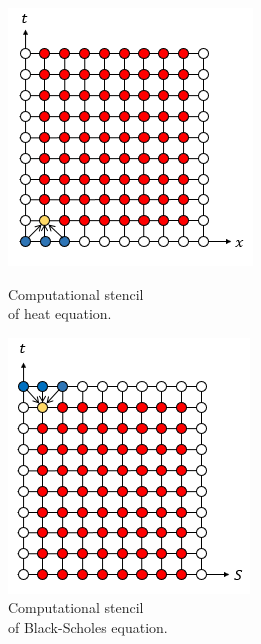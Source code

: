 \documentclass[12pt, oneside]{book}
\theoremstyle{plain}
\theoremstyle{definition}
\begin{document}
\begin{figure}[!htb]
  \begin{minipage}[b]{0.5\textwidth}
    \includegraphics[width=\textwidth]{ExplicitHeat.png}
    \caption{Computational stencil \\of heat equation.}
  \end{minipage}
  \begin{minipage}[b]{0.5\textwidth}
    \includegraphics[width=\textwidth]{ExplicitBS.png}
    \caption{Computational stencil \\of Black-Scholes equation.}
  \end{minipage}
\end{figure}
\end{document}
